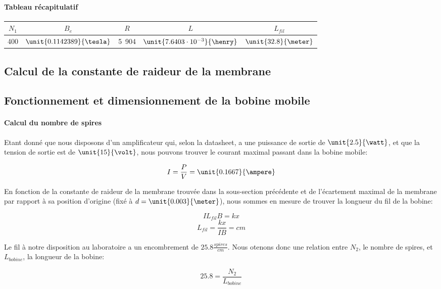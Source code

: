 \paragraph{Tableau récapitulatif}

\begin{center}
	\begin{tabular}{c|c|c|c|c}
		$N_1$ & $B_e$ & $R$ & $L$ & $L_{fil}$ \\
		\hline
		400 & $\unit{0.1142389}{\tesla}$ & \unit{5.904}{\ohm} & $\unit{7.6403 \cdot 10^{-3}}{\henry}$ & $\unit{32.8}{\meter}$\\
	\end{tabular}
\end{center}

\subsection{Calcul de la constante de raideur de la membrane}

\subsection{Fonctionnement et dimensionnement de la bobine mobile}

\paragraph{Calcul du nombre de spires}
Etant donné que nous disposons d'un amplificateur qui, selon la datasheet, a une puissance de sortie de 
$\unit{2.5}{\watt}$, et que la tension de sortie est de $\unit{15}{\volt}$, nous pouvons trouver le courant
maximal passant dans la bobine mobile:

$$I = \frac{P}{V} = \unit{0.1667}{\ampere}$$

En fonction de la constante de raideur de la membrane trouvée dans la sous-section précédente et de l'écartement
maximal de la membrane par rapport à sa position d'origine (fixé à $d = \unit{0.003}{\meter}$), nous sommes en
mesure de trouver la longueur du fil de la bobine:

$$IL_{fil}B = kx$$
$$L_{fil} = \frac{kx}{IB} =  cm$$

Le fil à notre disposition au laboratoire a un encombrement de $\unit{25.8}{\frac{spires}{cm}}$. Nous otenons 
donc une relation entre $N_2$, le nombre de spires, et $L_{bobine}$, la longueur de la bobine:

$$25.8 = \frac{N_2}{L_{bobine}}$$

